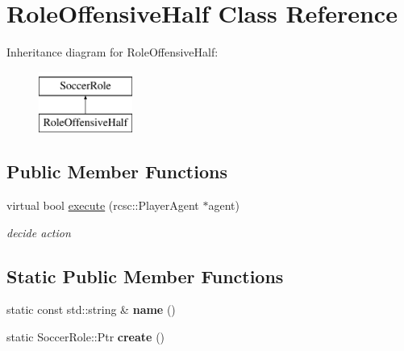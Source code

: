 \hypertarget{classRoleOffensiveHalf}{
\section{RoleOffensiveHalf Class Reference}
\label{classRoleOffensiveHalf}
}
Inheritance diagram for RoleOffensiveHalf:\begin{figure}[H]
\begin{center}
\leavevmode
\includegraphics[height=2.000000cm]{classRoleOffensiveHalf}
\end{center}
\end{figure}
\subsection*{Public Member Functions}
\begin{DoxyCompactItemize}
\item 
\hypertarget{classRoleOffensiveHalf_a9311fa148002f5cb05625ca77ad10a49}{
virtual bool \hyperlink{classRoleOffensiveHalf_a9311fa148002f5cb05625ca77ad10a49}{execute} (rcsc::PlayerAgent $\ast$agent)}
\label{classRoleOffensiveHalf_a9311fa148002f5cb05625ca77ad10a49}

\begin{DoxyCompactList}\small\item\em decide action \item\end{DoxyCompactList}\end{DoxyCompactItemize}
\subsection*{Static Public Member Functions}
\begin{DoxyCompactItemize}
\item 
\hypertarget{classRoleOffensiveHalf_a1c379f82aa5876f52c57d4b458442810}{
static const std::string \& {\bfseries name} ()}
\label{classRoleOffensiveHalf_a1c379f82aa5876f52c57d4b458442810}

\item 
\hypertarget{classRoleOffensiveHalf_a16876b766ee30f40586cb68ba0cad7f5}{
static SoccerRole::Ptr {\bfseries create} ()}
\label{classRoleOffensiveHalf_a16876b766ee30f40586cb68ba0cad7f5}

\end{DoxyCompactItemize}
